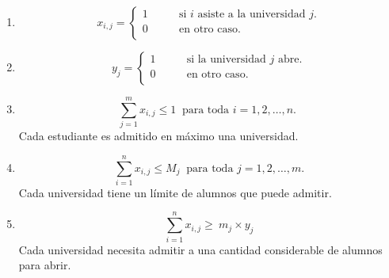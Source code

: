 \begin{enumerate}
\item \begin{equation} \label{r1}
x_{i,j}= 
\begin{cases}
1 & \qquad \text{si $i$ asiste a la universidad $j$.} \\
0 &\qquad\text{en otro caso.}\ \\ 
\end{cases} \end{equation}
\item \begin{equation} y_{j}= 
\begin{cases}
1 & \qquad \text{si la universidad $j$ abre.} \\
0 &\qquad\text{en otro caso.} \\ 
\end{cases} \end{equation}
\item \begin{equation} \label{r2}
\sum_{j=1}^{m}x_{i,j} \leq1 \ \text{ para toda $i=1,2,\ldots,n$. }
\end{equation} Cada estudiante es admitido en máximo una universidad. 
\item \begin{equation} \label{r3}
\sum_{i=1}^{n} x_{i,j} \leq M_j\ \text{ para toda $j=1,2,\dots,m$.} 
\end{equation}
Cada universidad tiene un límite de alumnos que puede admitir.
\item \begin{equation} \label{r4}
\sum_{i=1}^{n} x_{i,j} \geq\ m_j\times y_j 
\end{equation}
Cada universidad necesita admitir a una cantidad considerable de alumnos para abrir.


\end{enumerate}
